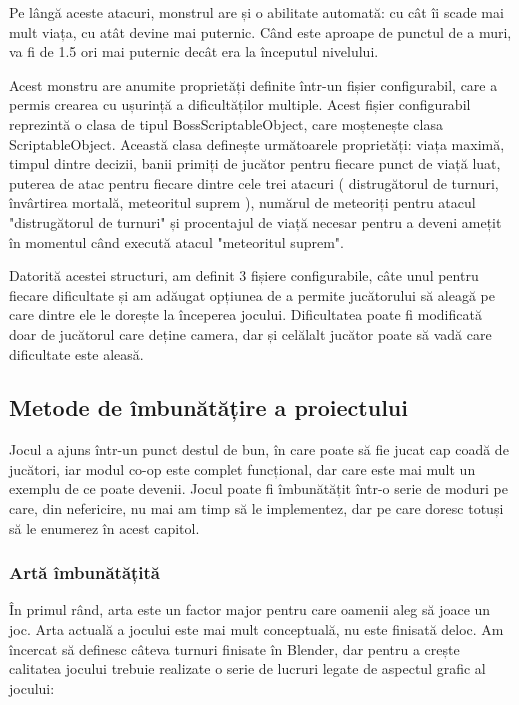 \documentclass[12pt, a4paper]{article}
\begin{document}
	Pe lângă aceste atacuri, monstrul are și o abilitate automată: cu cât îi scade mai mult viața, cu atât devine mai puternic. Când este aproape de punctul de a muri, va fi de 1.5 ori mai puternic decât era la începutul nivelului.
	\newline
	
	Acest monstru are anumite proprietăți definite într-un fișier configurabil, care a permis crearea cu ușurință a dificultăților multiple. Acest fișier configurabil reprezintă o clasa de tipul BossScriptableObject, care moștenește clasa ScriptableObject. Această clasa definește următoarele proprietăți: viața maximă, timpul dintre decizii, banii primiți de jucător pentru fiecare punct de viață luat, puterea de atac pentru fiecare dintre cele trei atacuri ( distrugătorul de turnuri, învârtirea mortală, meteoritul suprem ), numărul de meteoriți pentru atacul "distrugătorul de turnuri" și procentajul de viață necesar pentru a deveni amețit în momentul când execută atacul "meteoritul suprem".
	\newline
	
	Datorită acestei structuri, am definit 3 fișiere configurabile, câte unul pentru fiecare dificultate și am adăugat opțiunea de a permite jucătorului să aleagă pe care dintre ele le dorește la începerea jocului. Dificultatea poate fi modificată doar de jucătorul care deține camera, dar și celălalt jucător poate să vadă care dificultate este aleasă.
	
	
	
	
	
	\subsection{Metode de îmbunătățire a proiectului}
	
	Jocul a ajuns într-un punct destul de bun, în care poate să fie jucat cap coadă de jucători, iar modul co-op este complet funcțional, dar care este mai mult un exemplu de ce poate devenii. Jocul poate fi îmbunătățit într-o serie de moduri pe care, din nefericire, nu mai am timp să le implementez, dar pe care doresc totuși să le enumerez în acest capitol.
	
	
	
	
	
	\subsubsection{Artă îmbunătățită}
	
	În primul rând, arta este un factor major pentru care oamenii aleg să joace un joc. Arta actuală a jocului este mai mult conceptuală, nu este finisată deloc. Am încercat să definesc câteva turnuri finisate în Blender, dar pentru a crește calitatea jocului trebuie realizate o serie de lucruri legate de aspectul grafic al jocului:
	
\end{document}
